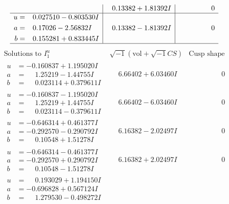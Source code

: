 \documentclass[1p]{elsarticle_modified}
\theoremstyle{definition}
\newcommand{\I}{\sqrt{-1}}
\begin{document}
$$\begin{array}{c|c|c}
 & \phantom{-}0.13382 + 1.81392 I & \phantom{-0.000000 } 0 \\ \hline\begin{aligned}
u &= \phantom{-}0.027510 - 0.803530 I \\
a &= \phantom{-}0.17026 - 2.56832 I \\
b &= \phantom{-}0.155281 + 0.833445 I\end{aligned}
 & \phantom{-}0.13382 - 1.81392 I & \phantom{-0.000000 } 0\\
 \hline 
 \end{array}$$\newpage$$\begin{array}{c|c|c}  
\text{Solutions to }I^u_{1}& \I (\text{vol} + \sqrt{-1}CS) & \text{Cusp shape}\\
 \hline 
\begin{aligned}
u &= -0.160837 + 1.195020 I \\
a &= \phantom{-}1.25219 - 1.44755 I \\
b &= \phantom{-}0.023114 + 0.379611 I\end{aligned}
 & \phantom{-}6.66402 + 6.03460 I & \phantom{-0.000000 } 0 \\ \hline\begin{aligned}
u &= -0.160837 - 1.195020 I \\
a &= \phantom{-}1.25219 + 1.44755 I \\
b &= \phantom{-}0.023114 - 0.379611 I\end{aligned}
 & \phantom{-}6.66402 - 6.03460 I & \phantom{-0.000000 } 0 \\ \hline\begin{aligned}
u &= -0.646314 + 0.461377 I \\
a &= -0.292570 - 0.290792 I \\
b &= \phantom{-}0.10548 + 1.51278 I\end{aligned}
 & \phantom{-}6.16382 - 2.02497 I & \phantom{-0.000000 } 0 \\ \hline\begin{aligned}
u &= -0.646314 - 0.461377 I \\
a &= -0.292570 + 0.290792 I \\
b &= \phantom{-}0.10548 - 1.51278 I\end{aligned}
 & \phantom{-}6.16382 + 2.02497 I & \phantom{-0.000000 } 0 \\ \hline\begin{aligned}
u &= \phantom{-}0.193029 + 1.194150 I \\
a &= -0.696828 + 0.567124 I \\
b &= \phantom{-}1.279530 - 0.498272 I\end{aligned}

\end{array}$$
\end{document}

